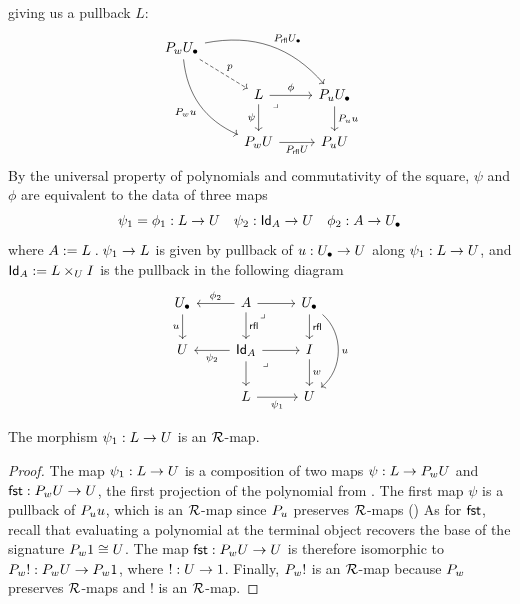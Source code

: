 giving us a pullback $L$:
  \begin{equation}
    \label{eq:id-elimination-2}
    \begin{tikzcd}
    { P_{\pp} \Ulow} && \\
    & L & {P_{\uu} \Ulow} \\
    & { P_{\pp} \U} & {P_{\uu} \U}
    \arrow["p", dashed, from=1-1, to=2-2]
    \arrow["{P_{\rfl} \Ulow}", bend left, from=1-1, to=2-3]
    \arrow["{P_{\pp} \uu}"', bend right, from=1-1, to=3-2]
    \arrow["\phi", from=2-2, to=2-3]
    \arrow["\psi"', from=2-2, to=3-2]
    \arrow["\lrcorner"{anchor=center, pos=0.125}, draw=none, from=2-2, to=3-3]
    \arrow["{P_{\uu} \uu}", from=2-3, to=3-3]
    \arrow["{P_{\rfl} \U}"', from=3-2, to=3-3]
  \end{tikzcd}
  \end{equation}
By the universal property of polynomials
and commutativity of the square,
$\psi$ and $\phi$ are equivalent to the data of three maps
\[\psi_1 = \phi_1 : L \to U
\quad \psi_2 : \mathsf{Id}_A \to U
\quad \phi_2 : {A} \to {U_\bullet}\]
where $A := L \mathrel{.} \psi_1 \to L$ is
given by pullback of ${u} : {U_\bullet} \to U$ along $\psi_1 : L \to U$,
and $\mathsf{Id}_A := L \times_U I$ is the pullback in the following diagram
\begin{equation}\label{eq:id-elimination-1}
  \begin{tikzcd}
	\Ulow & {{A}} & \Ulow \\
	\U & {\Id_{A}} & I \\
	& L & \U
	\arrow["\uu"', from=1-1, to=2-1]
	\arrow["{\phi_2}"', from=1-2, to=1-1]
	\arrow[from=1-2, to=1-3]
	\arrow["{\rfl}", from=1-2, to=2-2]
	\arrow["\lrcorner"{anchor=center, pos=0.125}, draw=none, from=1-2, to=2-3]
	\arrow["\rfl", from=1-3, to=2-3]
	\arrow["{\uu}", bend left = 50, from=1-3, to=3-3]
	\arrow["{\psi_2}", from=2-2, to=2-1]
	\arrow[from=2-2, to=2-3]
	\arrow[from=2-2, to=3-2]
	\arrow["\lrcorner"{anchor=center, pos=0.125}, draw=none, from=2-2, to=3-3]
	\arrow["\pp", from=2-3, to=3-3]
	\arrow["{\psi_1}"', from=3-2, to=3-3]
\end{tikzcd}
\end{equation}

\begin{lemma}
  \label{lem:psi-fibration}
  The morphism $\psi_1 : L \to U$ is an $\mathcal{R}$-map.
\end{lemma}
\begin{proof}
  The map $\psi_1 : L \to U$ is a composition of two maps
  $\psi : L \to P_{w} U$ and
  $\mathop{\mathsf{fst}} : P_{w} U \to U$,
  the first projection of the polynomial from .
  The first map $\psi$ is a pullback of $P_{u} {u}$,
  which is an $\mathcal{R}$-map
  since $P_{u}$ preserves $\mathcal{R}$-maps
  ()
  As for $\mathop{\mathsf{fst}}$,
  recall that evaluating a polynomial at the terminal object
  recovers the base of the signature
  $P_{w} 1 \cong U$.
  The map $\mathop{\mathsf{fst}} : P_{w} U \to U$ is therefore isomorphic to
  $P_{w} ! : P_{w} U \to P_{w} 1$,
  where $! : U \to 1$.
  Finally, $P_{w} !$ is an $\mathcal{R}$-map because $P_{w}$ preserves $\mathcal{R}$-maps
  and $!$ is an $\mathcal{R}$-map.
\end{proof}

